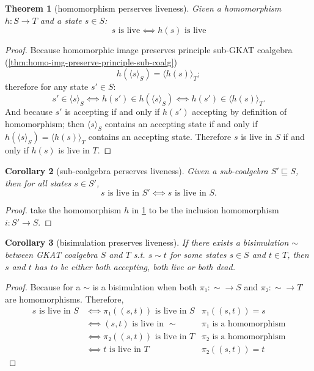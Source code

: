 \documentclass{extarticle}
\newtheorem{theorem}{Theorem}
\newtheorem{corollary}[theorem]{Corollary}
\begin{document}
\begin{theorem}[homomorphism perserves liveness]\label{thm:hom-preserve-liveness}
    Given a homomorphism \(h: S → T\) and a state \(s ∈ S\):
    \[\text{\(s\) is live} ⟺ \text{\(h(s)\) is live}\]
\end{theorem}

\begin{proof}
    Because homomorphic image preserves principle sub-GKAT coalgebra (\cref{thm:homo-img-preserve-principle-sub-coalg})
    \[h(⟨s⟩_S) = ⟨h(s)⟩_T;\]
    therefore for any state \(s' ∈ S\):
    \[s' ∈ ⟨s⟩_S ⟺ h(s') ∈ h(⟨s⟩_S) ⟺ h(s') ∈ ⟨h(s)⟩_T.\]
    And because \(s'\) is accepting if and only if \(h(s')\) accepting by definition of homomorphism; then \(⟨s⟩_S\) contains an accepting state if and only if \(h(⟨s⟩_S) = ⟨h(s)⟩_T\) contains an accepting state. 
    Therefore \(s\) is live in \(S\) if and only if \(h(s)\) is live in \(T\).
\end{proof}

\begin{corollary}[sub-coalgebra perserves liveness]\label{thm:sub-coalg-preserve-liveness}
    Given a sub-coalgebra \(S' ⊑ S\), then for all states \(s ∈ S'\),
    \[\text{\(s\) is live in \(S'\)} ⟺ \text{\(s\) is live in \(S\)}.\]
\end{corollary}

\begin{proof}
    take the homomorphism \(h\) in \cref{thm:hom-preserve-liveness} to be the inclusion homomorphism \(i: S' → S\).
\end{proof}

\begin{corollary}[bisimulation preserves liveness]\label{thm:bisim-preserve-liveness}
    If there exists a bisimulation \(∼\) between GKAT coalgebra \(S\) and \(T\) s.t. \(s ∼ t\) for some states \(s ∈ S\) and \(t ∈ T\), then \(s\) and \(t\) has to be either both accepting, both live or both dead.
\end{corollary}

\begin{proof}
    Because for a \(∼\) is a bisimulation when both \(π₁: {∼} → S\) and \(π₂: {∼} → T\) are homomorphisms.
    Therefore, 
    \begin{align*}
        s \text{ is live in } S 
        & ⟺ π₁((s, t)) \text{ is live in } S 
            & π₁((s, t)) = s\\  
        & ⟺ (s, t) \text{ is live in } {∼} 
            & \text{\(π₁\) is a homomorphism}\\  
        & ⟺ π₂((s, t)) \text{ is live in } T 
            & \text{\(π₂\) is a homomorphism} \\
        & ⟺ t \text{ is live in } T 
            & π₂((s, t)) = t
    \end{align*}
\end{proof}
\end{document}
